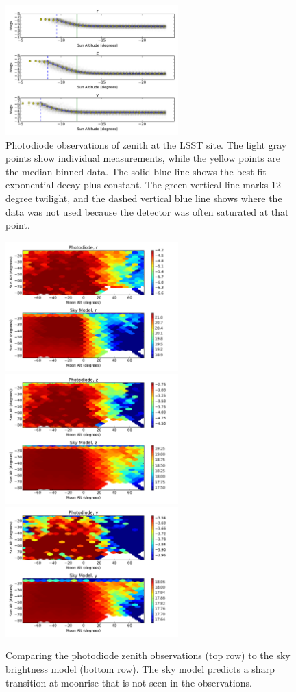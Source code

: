 \documentclass[]{spie}
\begin{document}
\begin{figure}
  \includegraphics[height=5cm]{plots/diode.pdf}
  \caption{Photodiode observations of zenith at the LSST site. The light gray points show individual measurements, while the yellow points are the median-binned data. The solid blue line shows the best fit exponential decay plus constant. The green vertical line marks 12 degree twilight, and the dashed vertical blue line shows where the data was not used because the detector was often saturated at that point. \label{diodePlot}}
\end{figure}


\begin{figure}
  \includegraphics[height=5cm]{plots/diodeCheck_r.pdf} \includegraphics[height=5cm]{plots/diodeCheck_z.pdf} \includegraphics[height=5cm]{plots/diodeCheck_y.pdf} \\
  \caption{Comparing the photodiode zenith observations (top row) to the sky brightness model (bottom row).  The sky model predicts a sharp transition at moonrise that is not seen in the observations.   \label{fig:compareZenithDiode}}
\end{figure}
\end{document}
